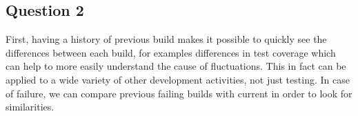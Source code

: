 \subsection*{Question 2}
\noindent First, having a history of previous build makes it possible to quickly see the differences between each build, for examples differences in test coverage which can help to more easily understand the cause of fluctuations. This in fact can be applied to a wide variety of other development activities, not just testing. In case of failure, we can compare previous failing builds with current in order to look for similarities.